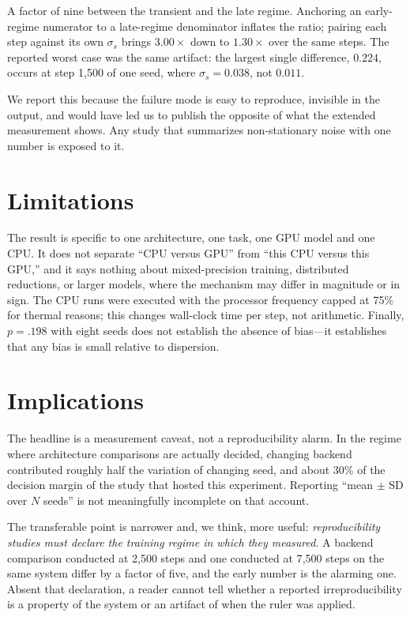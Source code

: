 \documentclass[jou,11pt,donotrepeattitle]{apa7}
\begin{document}
A factor of nine between the transient and the late regime. Anchoring an early-regime numerator
to a late-regime denominator inflates the ratio; pairing each step against its own $\sigma_s$
brings $3.00\times$ down to $1.30\times$ over the same steps. The reported worst case was the
same artifact: the largest single difference, $0.224$, occurs at step 1{,}500 of one seed, where
$\sigma_s = 0.038$, not $0.011$.

We report this because the failure mode is easy to reproduce, invisible in the output, and would
have led us to publish the opposite of what the extended measurement shows. Any study that
summarizes non-stationary noise with one number is exposed to it.

\section{Limitations}

The result is specific to one architecture, one task, one GPU model and one CPU. It does not
separate ``CPU versus GPU'' from ``this CPU versus this GPU,'' and it says nothing about
mixed-precision training, distributed reductions, or larger models, where the mechanism may
differ in magnitude or in sign. The CPU runs were executed with the processor frequency capped
at 75\% for thermal reasons; this changes wall-clock time per step, not arithmetic. Finally,
$p = .198$ with eight seeds does not establish the absence of bias---it establishes that any
bias is small relative to dispersion.

\section{Implications}

The headline is a measurement caveat, not a reproducibility alarm. In the regime where
architecture comparisons are actually decided, changing backend contributed roughly half the
variation of changing seed, and about 30\% of the decision margin of the study that hosted this
experiment. Reporting ``mean $\pm$ SD over $N$ seeds'' is not meaningfully incomplete on that
account.

The transferable point is narrower and, we think, more useful: \emph{reproducibility studies must
declare the training regime in which they measured}. A backend comparison conducted at 2{,}500
steps and one conducted at 7{,}500 steps on the same system differ by a factor of five, and the
early number is the alarming one. Absent that declaration, a reader cannot tell whether a
reported irreproducibility is a property of the system or an artifact of when the ruler was
applied.
\end{document}

